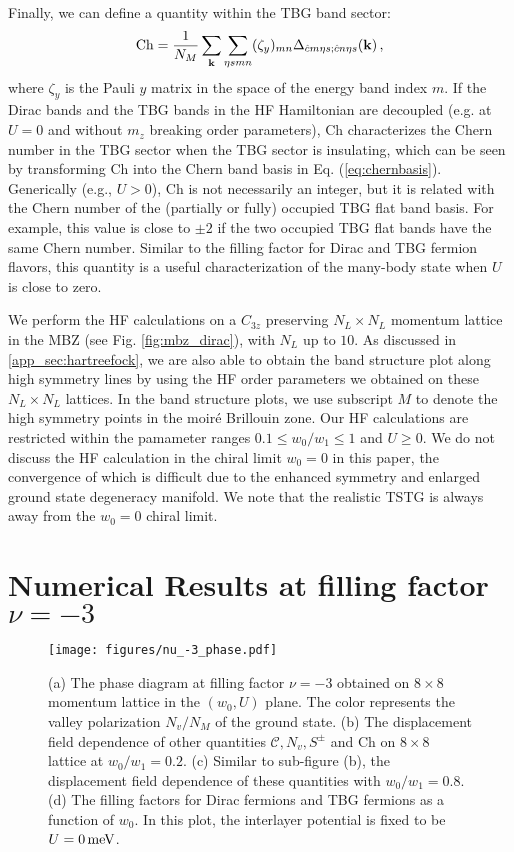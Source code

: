 \documentclass[prb,aps,nofootinbib,amssymb,twocolumn,superscriptaddress,10pt]{revtex4-2}
\begin{document}
Finally, we can define a quantity within the TBG band sector:
\begin{equation}\label{eqn:def_xi_y}
	\mathrm{Ch} = \frac{1}{N_M} \sum_{\mathbf{k}}\sum_{\eta s mn}(\zeta_y)_{mn}\Delta_{\hat{c}m\eta s; \hat{c}n\eta s}(\mathbf{k})\,,
\end{equation}
where $\zeta_y$ is the Pauli $y$ matrix in the space of the energy band index $m$. If the Dirac bands and the TBG bands in the HF Hamiltonian are decoupled (e.g. at $U=0$ and without $m_z$ breaking order parameters), $\mathrm{Ch}$ characterizes the Chern number in the TBG sector when the TBG sector is insulating, which can be seen by transforming $\mathrm{Ch}$ into the Chern band basis in Eq. (\ref{eq:chernbasis}). Generically (e.g., $U>0$), $\mathrm{Ch}$ is not necessarily an integer, but it is related with the Chern number of the (partially or fully) occupied TBG flat band basis. For example, this value is close to $\pm2$ if the two occupied TBG flat bands have the same Chern number. Similar to the filling factor for Dirac and TBG fermion flavors, this quantity is a useful characterization of the many-body state when $U$ is close to zero. 


We perform the HF calculations on a $C_{3z}$ preserving $N_L\times N_L$ momentum lattice in the MBZ (see Fig. \ref{fig:mbz_dirac}), with $N_L$ up to $10$. As discussed in \ref{app_sec:hartreefock}, we are also able to obtain the band structure plot along high symmetry lines by using the HF order parameters we obtained on these $N_L\times N_L$ lattices. In the band structure plots, we use subscript $M$ to denote the high symmetry points in the moir\'e Brillouin zone. Our HF calculations are restricted within the pamameter ranges $0.1\le w_0/w_1\le 1$ and $U\ge0$. We do not discuss the HF calculation in the chiral limit $w_0=0$ in this paper, the convergence of which is difficult due to the enhanced symmetry and enlarged ground state degeneracy manifold. We note that the realistic TSTG is always away from the $w_0=0$ chiral limit.


\section{Numerical Results at filling factor \texorpdfstring{$\nu=-3$}{nu=-3}}\label{sec:nu_-3}

\begin{figure*}[t]
	\centering
	\texttt{[image: figures/nu\_-3\_phase.pdf]}
	\caption{(a) The phase diagram at filling factor $\nu=-3$ obtained on $8\times 8$ momentum lattice in the $(w_0, U)$ plane. The color represents the valley polarization $N_v/N_M$ of the ground state. (b) The displacement field dependence of other quantities $\mathcal{C}, N_v, S^\pm$ and $\mathrm{Ch}$ on $8\times 8$ lattice at $w_0/w_1 = 0.2$. (c) Similar to sub-figure (b), the displacement field dependence of these quantities with $w_0/w_1 =0.8$. (d) The filling factors for Dirac fermions and TBG fermions as a function of $w_0$. In this plot, the interlayer potential is fixed to be $U=0\rm\,meV$. }
	\label{fig:nu=-3_phase}
\end{figure*}
\end{document}
